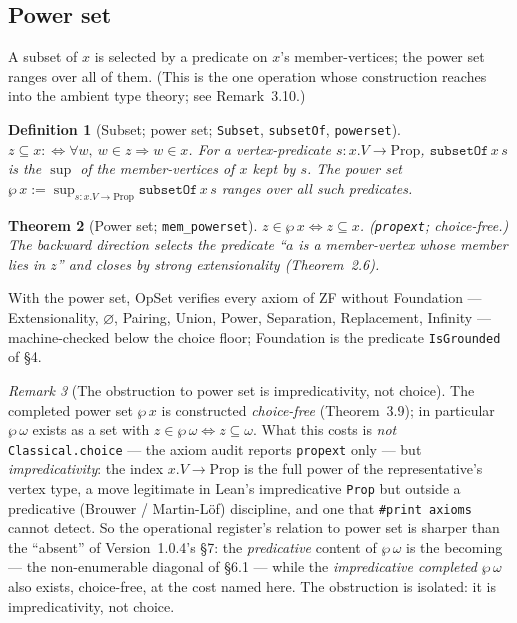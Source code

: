 \documentclass[11pt]{article}
\newtheorem{thm}{Theorem}[section]
\newtheorem{defn}[thm]{Definition}
\theoremstyle{remark}
\newtheorem{rem}[thm]{Remark}
\newcommand{\OpSet}{\textsf{OpSet}}
\begin{document}
\subsection{Power set}
A subset of $x$ is selected by a predicate on $x$'s member-vertices; the power set ranges over all of
them. (This is the one operation whose construction reaches into the ambient type theory; see
Remark~3.10.)
\begin{defn}[Subset; power set; \texttt{Subset}, \texttt{subsetOf}, \texttt{powerset}]
$z\subseteq x:\iff\forall w,\ w\in z\Rightarrow w\in x$. For a vertex-predicate $s:x.V\to\mathrm{Prop}$,
$\texttt{subsetOf}\,x\,s$ is the $\sup$ of the member-vertices of $x$ kept by $s$. The power set
$\wp\,x:=\sup_{s:x.V\to\mathrm{Prop}}\texttt{subsetOf}\,x\,s$ ranges over all such predicates.
\end{defn}
\begin{thm}[Power set; \texttt{mem\_powerset}]
$z\in\wp\,x \iff z\subseteq x$. (\texttt{propext}; choice-free.) The backward direction selects the
predicate ``$a$ is a member-vertex whose member lies in $z$'' and closes by strong extensionality
(Theorem~2.6).
\end{thm}
With the power set, \OpSet{} verifies every axiom of ZF without Foundation --- Extensionality,
$\varnothing$, Pairing, Union, Power, Separation, Replacement, Infinity --- machine-checked below the
choice floor; Foundation is the predicate \texttt{IsGrounded} of \S4.
\begin{rem}[The obstruction to power set is impredicativity, not choice]
The completed power set $\wp\,x$ is constructed \emph{choice-free} (Theorem~3.9); in particular
$\wp\,\omega$ exists as a set with $z\in\wp\,\omega\iff z\subseteq\omega$. What this costs is \emph{not}
\texttt{Classical.choice} --- the axiom audit reports \texttt{propext} only --- but
\emph{impredicativity}: the index $x.V\to\mathrm{Prop}$ is the full power of the representative's
vertex type, a move legitimate in Lean's impredicative \texttt{Prop} but outside a predicative
(Brouwer / Martin-L\"of) discipline, and one that \texttt{\#print axioms} cannot detect. So the
operational register's relation to power set is sharper than the ``absent'' of Version~1.0.4's \S7: the
\emph{predicative} content of $\wp\,\omega$ is the becoming --- the non-enumerable diagonal of \S6.1
--- while the \emph{impredicative completed} $\wp\,\omega$ also exists, choice-free, at the cost named
here. The obstruction is isolated: it is impredicativity, not choice.
\end{rem}
\end{document}
